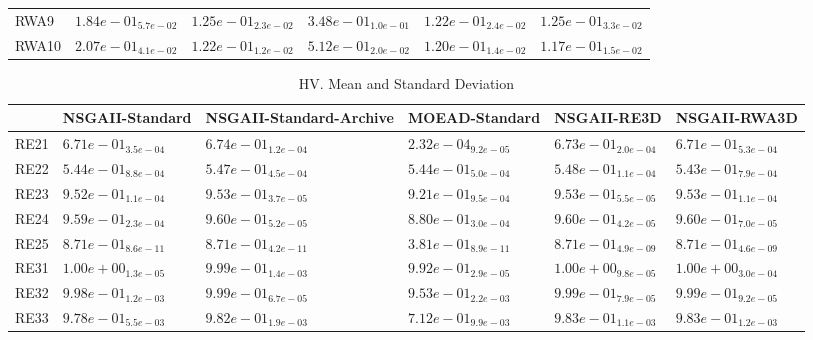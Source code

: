 \documentclass{article}
\begin{document}
\begin{table}
\begin{scriptsize}
\begin{tabular}{llllll}
RWA9 & $  1.84e-01_{ 5.7e-02}$ & $  1.25e-01_{ 2.3e-02}$ & $  3.48e-01_{ 1.0e-01}$ & \cellcolor{gray95}$  1.22e-01_{ 2.4e-02}$ & \cellcolor{gray25}$  1.25e-01_{ 3.3e-02}$ \\
RWA10 & $  2.07e-01_{ 4.1e-02}$ & $  1.22e-01_{ 1.2e-02}$ & $  5.12e-01_{ 2.0e-02}$ & \cellcolor{gray25}$  1.20e-01_{ 1.4e-02}$ & \cellcolor{gray95}$  1.17e-01_{ 1.5e-02}$ \\
\hline
\end{tabular}
\end{scriptsize}
\end{table}

\begin{table}
\caption{HV. Mean and Standard Deviation}
\label{table: HV}
\centering
\begin{scriptsize}
\begin{tabular}{llllll}
\hline & NSGAII-Standard & NSGAII-Standard-Archive & MOEAD-Standard & NSGAII-RE3D &  NSGAII-RWA3D\\
\hline 
RE21 & $  6.71e-01_{ 3.5e-04}$ & \cellcolor{gray95}$  6.74e-01_{ 1.2e-04}$ & $  2.32e-04_{ 9.2e-05}$ & \cellcolor{gray25}$  6.73e-01_{ 2.0e-04}$ & $  6.71e-01_{ 5.3e-04}$ \\
RE22 & $  5.44e-01_{ 8.8e-04}$ & \cellcolor{gray25}$  5.47e-01_{ 4.5e-04}$ & $  5.44e-01_{ 5.0e-04}$ & \cellcolor{gray95}$  5.48e-01_{ 1.1e-04}$ & $  5.43e-01_{ 7.9e-04}$ \\
RE23 & $  9.52e-01_{ 1.1e-04}$ & \cellcolor{gray25}$  9.53e-01_{ 3.7e-05}$ & $  9.21e-01_{ 9.5e-04}$ & \cellcolor{gray95}$  9.53e-01_{ 5.5e-05}$ & $  9.53e-01_{ 1.1e-04}$ \\
RE24 & $  9.59e-01_{ 2.3e-04}$ & \cellcolor{gray25}$  9.60e-01_{ 5.2e-05}$ & $  8.80e-01_{ 3.0e-04}$ & \cellcolor{gray95}$  9.60e-01_{ 4.2e-05}$ & $  9.60e-01_{ 7.0e-05}$ \\
RE25 & \cellcolor{gray25}$  8.71e-01_{ 8.6e-11}$ & \cellcolor{gray95}$  8.71e-01_{ 4.2e-11}$ & $  3.81e-01_{ 8.9e-11}$ & $  8.71e-01_{ 4.9e-09}$ & $  8.71e-01_{ 4.6e-09}$ \\
RE31 & \cellcolor{gray95}$  1.00e+00_{ 1.3e-05}$ & $  9.99e-01_{ 1.4e-03}$ & $  9.92e-01_{ 2.9e-05}$ & \cellcolor{gray25}$  1.00e+00_{ 9.8e-05}$ & $  1.00e+00_{ 3.0e-04}$ \\
RE32 & $  9.98e-01_{ 1.2e-03}$ & \cellcolor{gray95}$  9.99e-01_{ 6.7e-05}$ & $  9.53e-01_{ 2.2e-03}$ & \cellcolor{gray25}$  9.99e-01_{ 7.9e-05}$ & $  9.99e-01_{ 9.2e-05}$ \\
RE33 & $  9.78e-01_{ 5.5e-03}$ & $  9.82e-01_{ 1.9e-03}$ & $  7.12e-01_{ 9.9e-03}$ & \cellcolor{gray25}$  9.83e-01_{ 1.1e-03}$ & \cellcolor{gray95}$  9.83e-01_{ 1.2e-03}$ \\

\end{tabular}
\end{scriptsize}
\end{table}
\end{document}
